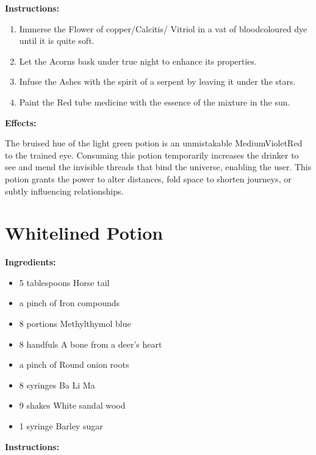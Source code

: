 \documentclass{article}
\begin{document}
\textbf{Instructions:}

\begin{enumerate}
  \item Immerse the Flower of copper/Calcitis/ Vitriol in a vat of bloodcoloured dye until it is quite soft.
  \item Let the Acorns bask under true night to enhance its properties.
  \item Infuse the Ashes with the spirit of a serpent by leaving it under the stars.
  \item Paint the Red tube medicine with the essence of the mixture in the sun.
\end{enumerate}

\textbf{Effects:}

The bruised hue of the light green potion is an unmistakable MediumVioletRed to the trained eye. Consuming this potion temporarily increases the drinker to see and mend the invisible threads that bind the universe, enabling the user. This potion grants the power to alter distances, fold space to shorten journeys, or subtly influencing relationships.

\newpage
\section*{Whitelined Potion}

\textbf{Ingredients:}

\begin{itemize}
  \item 5 tablespoons Horse tail
  \item a pinch of Iron compounds
  \item 8 portions Methylthymol blue
  \item 8 handfuls A bone from a deer's heart
  \item a pinch of Round onion roots
  \item 8 syringes Ba Li Ma
  \item 9 shakes White sandal wood
  \item 1 syringe Barley sugar
\end{itemize}

\textbf{Instructions:}
\end{document}
